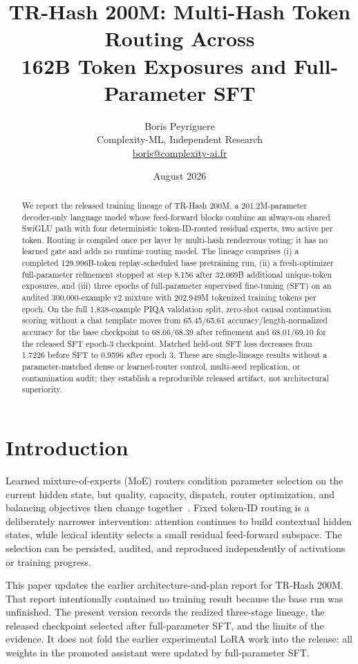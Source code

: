 \documentclass[10pt,twocolumn]{article}
\title{\vspace{-1.2em}\textbf{TR-Hash 200M: Multi-Hash Token Routing Across\\162B Token Exposures and Full-Parameter SFT}}
\author{Boris Peyriguere\\\small Complexity-ML, Independent Research\\\small \href{mailto:boris@complexity-ai.fr}{boris@complexity-ai.fr}}
\date{August 2026}
\newcommand{\model}{TR-Hash 200M}
\begin{document}
\maketitle

\begin{abstract}
We report the released training lineage of \model, a 201.2M-parameter decoder-only language model whose feed-forward blocks combine an always-on shared SwiGLU path with four deterministic token-ID-routed residual experts, two active per token. Routing is compiled once per layer by multi-hash rendezvous voting; it has no learned gate and adds no runtime routing model. The lineage comprises (i) a completed 129.996B-token replay-scheduled base pretraining run, (ii) a fresh-optimizer full-parameter refinement stopped at step 8,156 after 32.069B additional unique-token exposures, and (iii) three epochs of full-parameter supervised fine-tuning (SFT) on an audited 300,000-example v2 mixture with 202.949M tokenized training tokens per epoch. On the full 1,838-example PIQA validation split, zero-shot causal continuation scoring without a chat template moves from 65.45/65.61 accuracy/length-normalized accuracy for the base checkpoint to 68.66/68.39 after refinement and 68.01/69.10 for the released SFT epoch-3 checkpoint. Matched held-out SFT loss decreases from 1.7226 before SFT to 0.9596 after epoch 3. These are single-lineage results without a parameter-matched dense or learned-router control, multi-seed replication, or contamination audit; they establish a reproducible released artifact, not architectural superiority.
\end{abstract}

\section{Introduction}
Learned mixture-of-experts (MoE) routers condition parameter selection on the current hidden state, but quality, capacity, dispatch, router optimization, and balancing objectives then change together~\cite{shazeer2017outrageously,fedus2022switch,jiang2024mixtral}. Fixed token-ID routing is a deliberately narrower intervention: attention continues to build contextual hidden states, while lexical identity selects a small residual feed-forward subspace. The selection can be persisted, audited, and reproduced independently of activations or training progress.

This paper updates the earlier architecture-and-plan report for \model. That report intentionally contained no training result because the base run was unfinished. The present version records the realized three-stage lineage, the released checkpoint selected after full-parameter SFT, and the limits of the evidence. It does not fold the earlier experimental LoRA work into the release: all weights in the promoted assistant were updated by full-parameter SFT.
\end{document}
